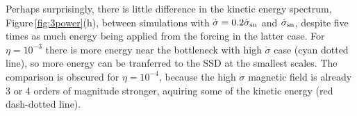 \documentclass[preprint2]{aastex63}
\newcommand\SNr{\dot\sigma_{\rm sn}}
\newcommand\pc{~ {\rm pc}}
\newcommand\dx{ {\delta x}}
\begin{document}

 Perhaps surprisingly, there is little difference in the kinetic energy
 spectrum, Figure\,\ref{fig:3power}(h), between simulations with
 $\dot\sigma=0.2\SNr$ and $\SNr$, despite five times as much energy being
 applied from the forcing in the latter case.
 For $\eta=10^{-3}$ there is more energy near the bottleneck with high
 $\dot\sigma$ case (cyan dotted line), so more energy can be tranferred to
 the SSD at the smallest scales.
 The comparison is obscured for $\eta=10^{-4}$, because the high $\dot\sigma$
 magnetic field is already 3 or 4 orders of magnitude stronger, aquiring some
 of the kinetic energy (red dash-dotted line).
\end{document}
